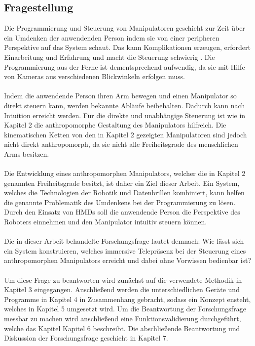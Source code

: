 \subsection{Fragestellung}
Die Programmierung und Steuerung von Manipulatoren geschieht zur Zeit über ein Umdenken der anwendenden Person indem sie von einer peripheren Perspektive auf das System schaut. Das kann Komplikationen erzeugen, erfordert Einarbeitung und Erfahrung und macht die Steuerung schwierig \cite[S.190]{ehlers_echtzeitfahige_2019}. Die Programmierung aus der Ferne ist dementsprechend aufwendig, da sie mit Hilfe von Kameras aus verschiedenen Blickwinkeln erfolgen muss.\\\\
Indem die anwendende Person ihren Arm bewegen und einen Manipulator so direkt steuern kann, werden bekannte Abläufe beibehalten. Dadurch kann nach \cite{blackler_towards_2007} Intuition erreicht werden. Für die direkte und unabhängige Steuerung ist wie in Kapitel 2 die anthropomorphe Gestaltung des Manipulators hilfreich. Die kinematischen Ketten von den in Kapitel 2 gezeigten Manipulatoren sind jedoch nicht direkt anthropomorph, da sie nicht alle Freiheitsgrade des menschlichen Arms besitzen.\\\\
Die Entwicklung eines anthropomorphen Manipulators, welcher die in Kapitel 2 genannten Freiheitsgrade besitzt, ist daher ein Ziel dieser Arbeit. Ein System, welches die Technologien der Robotik und Datenbrillen kombiniert, kann helfen die genannte Problematik des Umdenkens bei der Programmierung zu lösen. Durch den Einsatz von HMDs soll die anwendende Person die Perspektive des Roboters einnehmen und den Manipulator intuitiv steuern können.\\\\
Die in dieser Arbeit behandelte Forschungsfrage lautet demnach: Wie lässt sich ein System konstruieren, welches immersive Telepräsenz bei der Steuerung eines anthropomorphen Manipulators erreicht und dabei ohne Vorwissen bedienbar ist?\\\\
Um diese Frage zu beantworten wird zunächst auf die verwendete Methodik in Kapitel 3 eingegangen. Anschließend werden die unterschiedlichen Geräte und Programme in Kapitel 4 in Zusammenhang gebracht, sodass ein Konzept ensteht, welches in Kapitel 5 umgesetzt wird. Um die Beantwortung der Forschungsfrage messbar zu machen wird anschließend eine Funktionsvalidierung durchgeführt, welche das Kapitel Kapitel 6 beschreibt. Die abschließende Beantwortung und Diskussion der Forschungsfrage geschieht in Kapitel 7.
